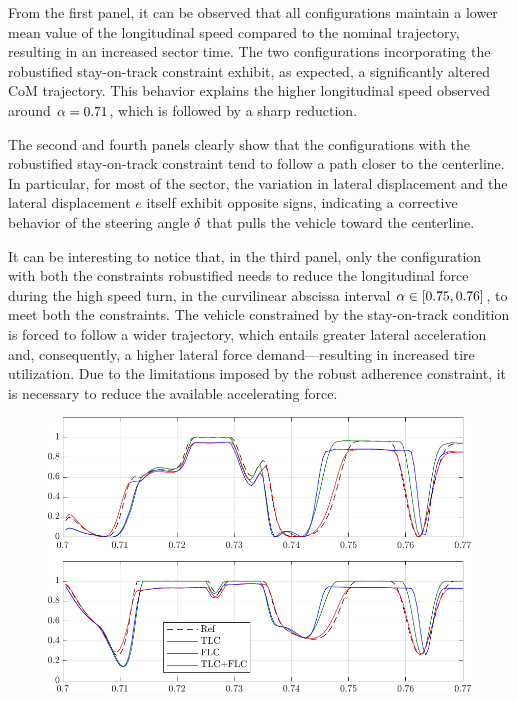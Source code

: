 From the first panel, it can be observed that all configurations maintain a lower mean value of the longitudinal speed compared to the nominal trajectory, resulting in an increased sector time. The two configurations incorporating the robustified stay-on-track constraint exhibit, as expected, a significantly altered CoM trajectory. This behavior explains the higher longitudinal speed observed around $\alpha = 0.71$, which is followed by a sharp reduction. 

The second and fourth panels clearly show that the configurations with the robustified stay-on-track constraint tend to follow a path closer to the centerline. In particular, for most of the sector, the variation in lateral displacement and the lateral displacement $e$ itself exhibit opposite signs, indicating a corrective behavior of the steering angle $\delta$ that pulls the vehicle toward the centerline.

It can be interesting to notice that, in the third panel, only the configuration with both the constraints robustified needs to reduce the longitudinal force during the high speed turn, in the curvilinear abscissa interval $\alpha\in\left[0.75, 0.76\right]$, to meet both the constraints. 
The vehicle constrained by the stay-on-track condition is forced to follow a wider trajectory, which entails greater lateral acceleration and, consequently, a higher lateral force demand---resulting in increased tire utilization. Due to the limitations imposed by the robust adherence constraint, it is necessary to reduce the available accelerating force.

\begin{figure}
	\centering
	\includegraphics{Fig/ol_saturation.pdf}
	\caption{}
	\label{fig:ol_saturation}
\end{figure}

